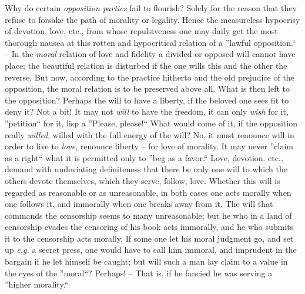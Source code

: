 \documentclass[12pt,a4paper]{book}
\begin{document}
Why do certain \textit{opposition parties} fail to flourish? Solely for the 
reason that they refuse to forsake the path of morality or legality. Hence the 
measureless hypocrisy of devotion, love, etc., from whose repulsiveness one 
may daily get the most thorough nausea at this rotten and hypocritical 
relation of a ''lawful opposition.`` -- In the \textit{moral} relation of 
love and fidelity a divided or opposed will cannot have place; the beautiful 
relation is disturbed if the one wills this and the other the reverse. But 
now, according to the practice hitherto and the old prejudice of the 
opposition, the moral relation is to be preserved above all. What is then left 
to the opposition? Perhaps the will to have a liberty, if the beloved one sees 
fit to deny it? Not a bit! It may not \textit{will} to have the freedom, it 
can only \textit{wish} for it, ''petition`` for it, lisp a ''Please, 
please!`` What would come of it, if the opposition really \textit{willed}, 
willed with the full energy of the will? No, it must renounce will in order to 
live to \textit{love}, renounce liberty -- for love of morality. It may never 
''claim as a right`` what it is permitted only to ''beg as a favor.`` 
Love, devotion. etc., demand with undeviating definiteness that there be only 
one will to which the others devote themselves, which they serve, follow, 
love. Whether this will is regarded as reasonable or as unreasonable, in both 
cases one acts morally when one follows it, and immorally when one breaks away 
from it. The will that commands the censorship seems to many unreasonable; but 
he who in a land of censorship evades the censoring of his book acts 
immorally, and he who submits it to the censorship acts morally. If some one 
let his moral judgment go, and set up \textit{e.g.} a secret press, one would 
have to call him immoral, and imprudent in the bargain if he let himself be 
caught; but will such a man lay claim to a value in the eyes of the 
''moral``? Perhaps! -- That is, if he fancied he was serving a ''higher 
morality.``
\end{document}
